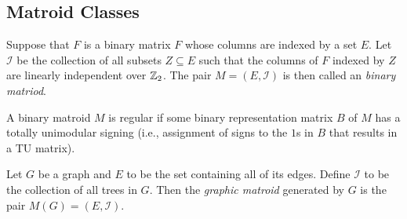 \begin{definition}
  \label{def:series_elems}
\end{definition}


\subsection{Matroid Classes}

\begin{definition}
  \label{def:binary_matroid}
  Suppose that $F$ is a binary matrix $F$ whose columns are indexed by a set $E$.
  Let $\mathcal{I}$ be the collection of all subsets $Z \subseteq E$ such that the columns of $F$ indexed by $Z$ are linearly
  independent over $\mathbb{Z}_2$. The pair $M = (E, \mathcal{I})$ is then called an \emph{binary matriod}.
\end{definition}

\begin{definition}
  \label{def:regular_matroid}
  A binary matroid $M$ is regular if some binary representation matrix $B$ of $M$ has a totally unimodular signing (i.e., assignment of signs to the $1$s in $B$ that results in a TU matrix).
\end{definition}


\begin{definition}
  \label{def:graphic_matroid}
  Let $G$ be a graph and $E$ to be the set containing all of its edges. Define $\mathcal{I}$ to be the collection of all trees
  in $G$. Then the \emph{graphic matroid} generated by $G$ is the pair $M(G) = (E,\mathcal{I})$.
\end{definition}

\begin{definition}
  \label{def:cographic_matroid}
\end{definition}

\begin{definition}
  \label{def:planar_matroid}
\end{definition}

